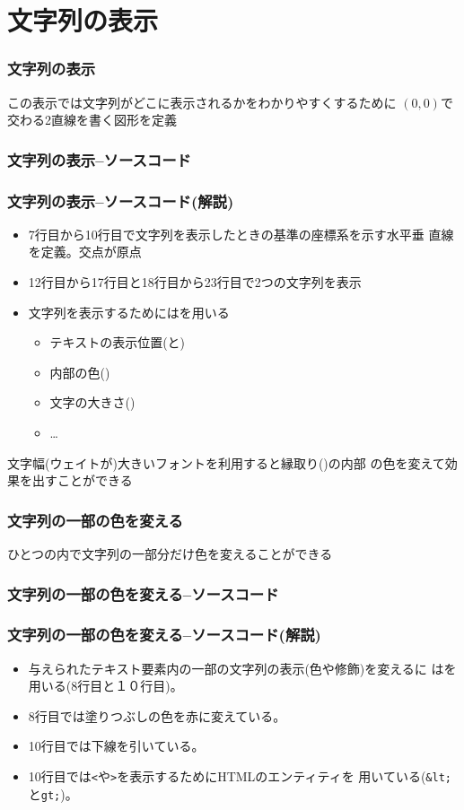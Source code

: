 

\frame{\maketitle}
\section{文字列の表示}
\begin{frame}[containsverbatim]
 \frametitle{文字列の表示}
 この表示では文字列がどこに表示されるかをわかりやすくするために
       $(0,0)$で交わる2直線を書く図形を定義
\end{frame}
\begin{frame}[containsverbatim]
 \frametitle{文字列の表示--ソースコード}
\end{frame}
\begin{frame}[containsverbatim]
 \frametitle{文字列の表示--ソースコード(解説)}
 \begin{itemize}
  \item 7行目から10行目で文字列を表示したときの基準の座標系を示す水平垂
        直線を定義。交点が原点
  \item 12行目から17行目と18行目から23行目で2つの文字列を表示
  \item 文字列を表示するためにはを用いる
        \begin{itemize}
         \item テキストの表示位置(と)
         \item 内部の色()
         \item 文字の大きさ()
         \item \dots
        \end{itemize}
 \end{itemize}
 文字幅(ウェイトが)大きいフォントを利用すると縁取り()の内部
 の色を変えて効果を出すことができる
\end{frame}
 \begin{frame}[containsverbatim]
  \frametitle{文字列の一部の色を変える}
  ひとつの内で文字列の一部分だけ色を変えることができる
 \end{frame}
 \begin{frame}[containsverbatim]
  \frametitle{文字列の一部の色を変える--ソースコード}
 \end{frame}
 \begin{frame}[containsverbatim]
  \frametitle{文字列の一部の色を変える--ソースコード(解説)}
\begin{itemize}
 \item 与えられたテキスト要素内の一部の文字列の表示(色や修飾)を変えるに
			 はを用いる(8行目と１０行目)。
 \item 8行目では塗りつぶしの色を赤に変えている。
 \item 10行目では下線を引いている。
 \item 10行目では\Verb+<+や\Verb+>+を表示するためにHTMLのエンティティを
			 用いている(\Verb+&lt;+と\Verb+gt;+)。
\end{itemize}
 \end{frame}
